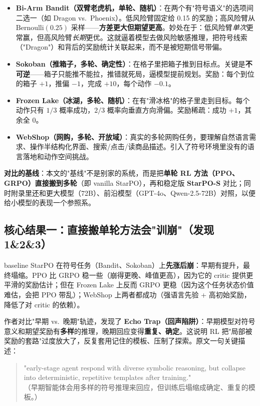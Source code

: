 \documentclass[11pt,UTF8,fontset=fandol]{ctexart}
\begin{document}
\begin{itemize}[leftmargin=1.4em,itemsep=2pt,topsep=2pt]
\item \textbf{Bi-Arm Bandit（双臂老虎机，单轮、随机）}：在两个有"符号语义"的选项间二选一（如 Dragon vs.\ Phoenix）。低风险臂固定给 0.15 的奖励；高风险臂从 $\text{Bernoulli}(0.25)$ 采样——\textbf{方差更大但期望更高}。妙处在于：低风险臂\emph{单次}更常赢，但高风险臂\emph{长期}更优。这就逼着模型去做风险敏感推理，把符号线索（"Dragon"）和背后的奖励统计关联起来，而不是被短期信号带偏。
\item \textbf{Sokoban（推箱子，多轮、确定性）}：在格子里把箱子推到目标点。关键是\textbf{不可逆}——箱子只能推不能拉，推错就死局，逼模型提前规划。奖励：每个到位的箱子 $+1$，推偏 $-1$，完成 $+10$，每个动作 $-0.1$。
\item \textbf{Frozen Lake（冰湖，多轮、随机）}：在有"滑冰格"的格子里走到目标。每个动作只有 $1/3$ 概率成功，$2/3$ 概率向垂直方向滑偏。奖励稀疏：成功 $+1$，其余全 $0$。
\item \textbf{WebShop（网购，多轮、开放域）}：真实的多轮网购任务，要理解自然语言需求、操作半结构化界面、搜索/点击/读商品描述。引入了符号环境里没有的语言落地和动作空间挑战。
\end{itemize}

\textbf{对比的基线}：本文的"基线"不是别家的系统，而是把\textbf{单轮 RL 方法（PPO、GRPO）直接搬到多轮}（即 vanilla StarPO），再和稳定版 \textbf{StarPO-S} 对比；同时附录里还和更大模型（72B）、前沿模型（GPT-4o、Qwen-2.5-72B）对照，以便给小模型的表现一个参照系。

\subsection{核心结果一：直接搬单轮方法会"训崩"（发现 1\&2\&3）}

baseline StarPO 在符号任务（Bandit、Sokoban）上\textbf{先涨后崩}：早期有提升，最终塌缩。PPO 比 GRPO 稳一些（崩得更晚、峰值更高），因为它的 critic 提供更平滑的奖励估计；但在 Frozen Lake 上反而 GRPO 更稳（因为这个任务状态价值难估，会把 PPO 带乱）；WebShop 上两者都成功（强语言先验 + 高初始奖励，降低了对 critic 的依赖）。

作者对比"早期 vs.\ 晚期"轨迹，发现了 \textbf{Echo Trap（回声陷阱）}：早期模型对符号意义和期望奖励有\textbf{多样}的推理，晚期回应变得\textbf{重复、确定}。这说明 RL 把"局部被奖励的套路"过度放大了，反复套用记住的模板、压制了探索。原文一句关键描述：
\begin{quote}\small
"early-stage agent respond with diverse symbolic reasoning, but collapse into deterministic, repetitive templates after training."\\
（早期智能体会用多样的符号推理来回应，但训练后塌缩成确定、重复的模板。）
\end{quote}
\end{document}
